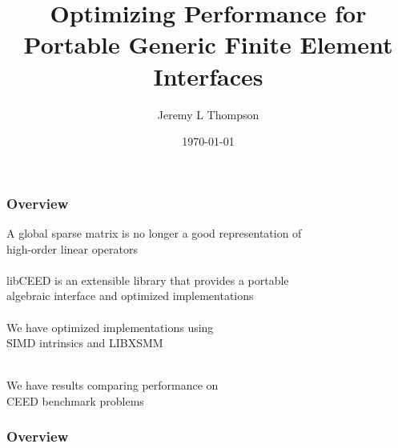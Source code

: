 \documentclass{beamer}
\title[libCEED Finite Element Library]{Optimizing Performance for Portable Generic Finite Element Interfaces} %
\author{Jeremy L Thompson} %
\institute[CU Boulder] %
{University of Colorado Boulder \\ %
\medskip
\textit{jeremy.thompson@colorado.edu} %
}
\date{\today} %
\begin{document}
\begin{frame}
\titlepage %
\end{frame}


\begin{frame}
\begin{center}
\frametitle{Overview}

A global sparse matrix is no longer a good representation of\\high-order linear operators\\

~\\

libCEED is an extensible library that provides a portable\\algebraic interface and optimized implementations\\

~\\

We have optimized implementations using\\SIMD intrinsics and LIBXSMM

~\\

We have results comparing performance on\\CEED benchmark problems

\end{center}
\end{frame}
 

\begin{frame}
\frametitle{Overview} %
\tableofcontents %
\end{frame}

\end{document}
